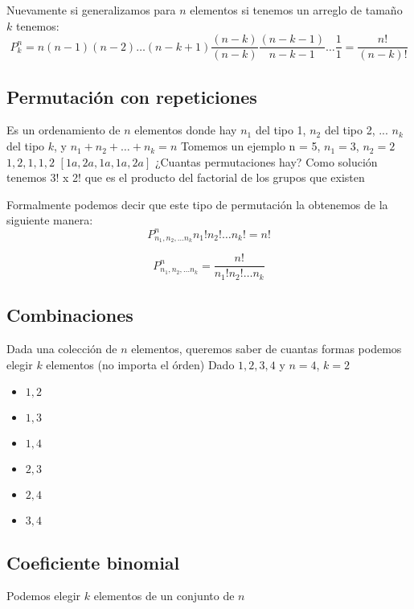 Nuevamente si generalizamos para $n$ elementos si tenemos un arreglo de tamaño $k$ tenemos:
\[
    P_{k}^{n} = n(n - 1)(n - 2) \dots (n - k + 1) \frac{(n - k)}{(n - k)} \frac{(n - k - 1)}{n - k - 1} \dots \frac{1}{1} = \frac{n!}{(n - k)!}   
\]

\subsection{Permutación con repeticiones}
Es un ordenamiento de $n$ elementos donde hay $n_{1}$ del tipo 1, $n_{2}$ del tipo 2, ... $n_{k}$ del tipo $k$, y $n_{1} + n_{2} + \dots + n_{k} = n$  \newline
Tomemos un ejemplo\newline
n = 5, $n_{1} = 3$, $n_{2} = 2$ \newline
${1, 2, 1, 1, 2}$ \newline
$[1a, 2a, 1a, 1a, 2a]$ \newline
¿Cuantas permutaciones hay? Como solución tenemos 3! x 2! que es el producto del factorial de los grupos que existen \newline

Formalmente podemos decir que este tipo de permutación la obtenemos de la siguiente manera:
\[
    P_{n_{1}, n_{2}, \dots n_{k} }^{ n } n_{1}!n_{2}! \dots n_{k}! = n!
\]

\[
    P_{n_{1}, n_{2}, \dots n_{k} }^{ n } = \frac{n!}{n_{1}!n_{2}! \dots n_{k} }
\]

\subsection{Combinaciones}
Dada una colección de $n$ elementos, queremos saber de cuantas formas podemos elegir $k$ elementos (no importa el órden) \newline
Dado ${1, 2, 3, 4}$ y $n = 4$, $k = 2$
\begin{itemize}
    \item { ${1, 2}$ }
    \item { ${1, 3}$ }
    \item { ${1, 4}$ }
    \item { ${2, 3}$ }
    \item { ${2, 4}$ }
    \item { ${3, 4}$ }
\end{itemize}

\subsection{Coeficiente binomial}
Podemos elegir $k$ elementos de un conjunto de $n$ \newline

